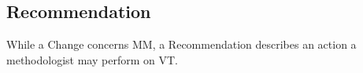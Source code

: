 \subsection{Recommendation}
\label{sec:Suggestion:Recommendation}

While a \textsf{Change} concerns \textsf{MM}, a \textsf{Recommendation} describes
an action a methodologist may perform on \textsf{VT}. 